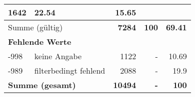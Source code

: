\begin{longtable}{lXrrr}
       \num{1642} &
       \num[round-mode=places,round-precision=2]{22.54} &
         \num[round-mode=places,round-precision=2]{15.65} \\
     \midrule
     \multicolumn{2}{l}{Summe (gültig)} &
       \textbf{\num{7284}} &
     \textbf{\num{100}} &
       \textbf{\num[round-mode=places,round-precision=2]{69.41}} \\
     \multicolumn{5}{l}{\textbf{Fehlende Werte}}\\
       -998 &
       keine Angabe &
         \num{1122} &
        - &
         \num[round-mode=places,round-precision=2]{10.69} \\
       -989 &
       filterbedingt fehlend &
         \num{2088} &
        - &
         \num[round-mode=places,round-precision=2]{19.9} \\
     \midrule
     \multicolumn{2}{l}{\textbf{Summe (gesamt)}} &
          \textbf{\num{10494}} &
        \textbf{-} &
        \textbf{\num{100}} \\
     \bottomrule
     \end{longtable}
     
